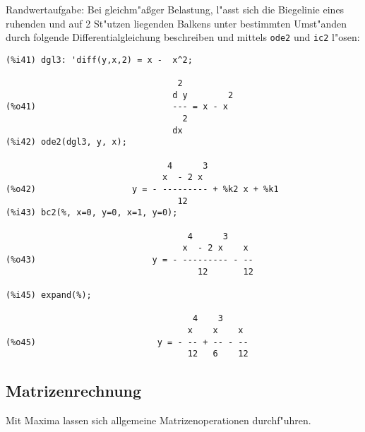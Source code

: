 \documentclass[ngerman,12pt,a4paper]{article}
\begin{document}
Randwertaufgabe: Bei gleichm"a{\ss}ger Belastung, l"asst sich die Biegelinie eines ruhenden und auf 2 St"utzen liegenden Balkens unter bestimmten Umst"anden durch folgende Differentialgleichung beschreiben und mittels \verb|ode2| und \verb|ic2| l"osen:

\scriptsize
\begin{verbatim}
(%i41) dgl3: 'diff(y,x,2) = x -  x^2;

                                  2
                                 d y        2
(%o41)                           --- = x - x
                                   2
                                 dx
(%i42) ode2(dgl3, y, x);

                                4      3
                               x  - 2 x
(%o42)                   y = - --------- + %k2 x + %k1
                                  12
(%i43) bc2(%, x=0, y=0, x=1, y=0);

                                    4      3
                                   x  - 2 x    x
(%o43)                       y = - --------- - --
                                      12       12

(%i45) expand(%);

                                     4    3
                                    x    x    x
(%o45)                        y = - -- + -- - --
                                    12   6    12
\end{verbatim}
\normalsize

\subsection{Matrizenrechnung}

Mit Maxima lassen sich allgemeine Matrizenoperationen durchf"uhren.
\end{document}
